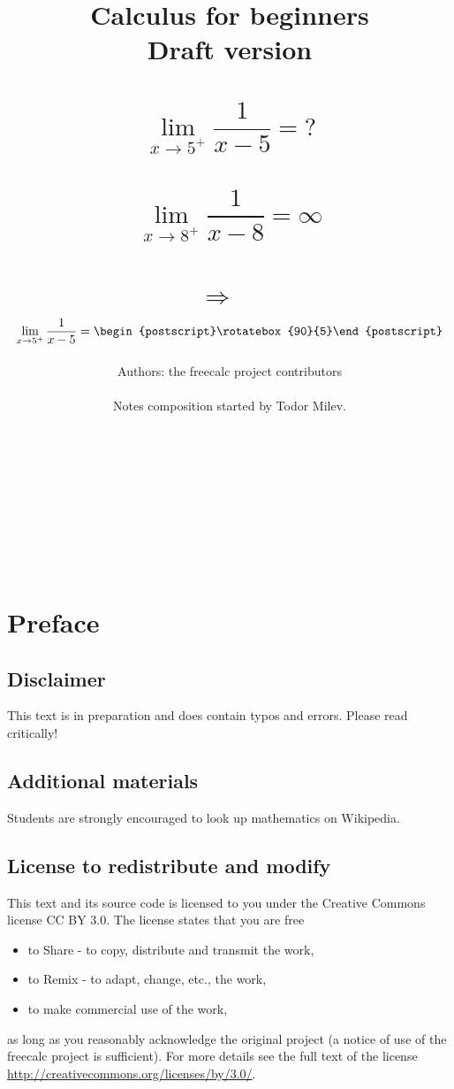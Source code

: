 \documentclass[12pt]{book}
\author{Authors: the freecalc project contributors \\~\\ Notes composition started by Todor Milev.}
\title{Calculus for beginners \\Draft version \\ ~\\
\[
\lim\limits_{x\to 5^+}\frac{1}{x-5}= ?
\]
~\\
\[
\lim\limits_{x\to 8^+}\frac{1}{x-8}=\infty
\]
~\\
$\Rightarrow$
~\\
\[
\lim\limits_{x\to 5^+}\frac{1}{x-5}= \begin{postscript}\rotatebox{90}{5}\end{postscript}
\]
}
\begin{document}
\maketitle

{
~

\bigskip

~

\bigskip

~

\bigskip

~

\bigskip

\begin{center}
\Huge{\color{red}}
\end{center}
} %



\chapter*{Preface}


\section*{Disclaimer}
This text is in preparation and does contain typos and errors. Please read critically!

\section*{Additional materials} Students are strongly encouraged to look up mathematics on Wikipedia.


\section*{License to redistribute and modify} This text and its source code is licensed to you under the Creative Commons license CC BY 3.0. The license states that you are free
\begin{itemize}
\item to Share - to copy, distribute and transmit the work,
\item to Remix - to adapt, change, etc., the work,
\item to make commercial use of the work,
\end{itemize}
as long as you reasonably acknowledge the original project (a notice of use of the freecalc project is sufficient). For more details see the full text of the license \url{http://creativecommons.org/licenses/by/3.0/}.
\end{document}
